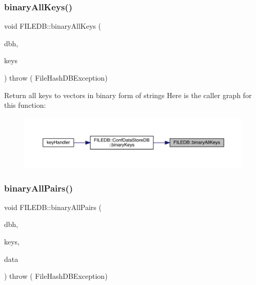 \mbox{\label{namespaceFILEDB_a208d694e308a85bd3b04277ffe369377}} 
\subsubsection{\texorpdfstring{binaryAllKeys()}{binaryAllKeys()}}
{\footnotesize\ttfamily void F\+I\+L\+E\+D\+B\+::binary\+All\+Keys (\begin{DoxyParamCaption}\item[{\mbox{\hyperlink{other__libs_2filedb_2filehash_2ffdb__db_8h_a0b27b956926453a7a8141ea8e10f0df8}{F\+F\+D\+B\+\_\+\+DB}} $\ast$}]{dbh,  }\item[{std\+::vector$<$ std\+::string $>$ \&}]{keys }\end{DoxyParamCaption}) throw ( File\+Hash\+D\+B\+Exception) }

Return all keys to vectors in binary form of strings Here is the caller graph for this function\+:\nopagebreak
\begin{figure}[H]
\begin{center}
\leavevmode
\includegraphics[width=350pt]{d2/de6/namespaceFILEDB_a208d694e308a85bd3b04277ffe369377_icgraph}
\end{center}
\end{figure}
\mbox{\label{namespaceFILEDB_ac242fd8f47258576482a692de8d1eaf3}} 
\subsubsection{\texorpdfstring{binaryAllPairs()}{binaryAllPairs()}}
{\footnotesize\ttfamily void F\+I\+L\+E\+D\+B\+::binary\+All\+Pairs (\begin{DoxyParamCaption}\item[{\mbox{\hyperlink{other__libs_2filedb_2filehash_2ffdb__db_8h_a0b27b956926453a7a8141ea8e10f0df8}{F\+F\+D\+B\+\_\+\+DB}} $\ast$}]{dbh,  }\item[{std\+::vector$<$ std\+::string $>$ \&}]{keys,  }\item[{std\+::vector$<$ std\+::string $>$ \&}]{data }\end{DoxyParamCaption}) throw ( File\+Hash\+D\+B\+Exception) }

